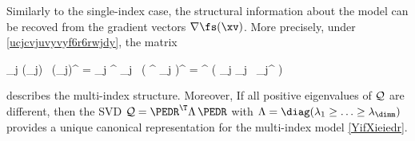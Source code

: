 Similarly to the single-index case, 
the structural information about the model
can be recoved from the gradient vectors \( \nabla \fs(\xv) \).
More precisely, under \eqref{ucjcvjuvyvyf6r6rwjdy}, the matrix
\begin{EQA}[c]
	\JEDR
	\eqdef
	\sum_{j \in \JJJ} \nabla \fs(\xv_{j}) \, \nabla \fs(\xv_{j})^{\T}
	=
	\sum_{j \in \JJJ} \PEDR^{\T} \fclv_{j} \, \bigl( \PEDR^{\T} \fclv_{j} \bigr)^{\T}
	=
	\PEDR^{\T} \biggl( \sum_{j \in \JJJ} \fclv_{j} \, \fclv_{j}^{\T} \biggr) \PEDR
	\, 
\label{ihjfiojihfer6t4rrt}
\end{EQA}
describes the multi-index structure.
Moreover, 
If all positive eigenvalues of \( \mathcal{Q} \) are different, 
then the SVD \( \JEDR = \PEDR^{\T} \Lambda \, \PEDR \) with \( \Lambda = \diag(\lambda_{1} \geq \ldots \geq \lambda_{\dimm}) \)
provides a unique canonical representation for the multi-index model \eqref{YifXieiedr}.


